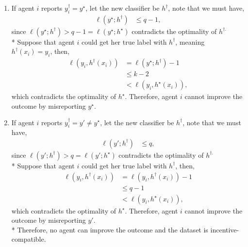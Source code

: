 \documentclass{article}
\begin{document}
\begin{enumerate}
\item If agent $i $ reports $y^{\dagger}_{i} = y^\star $, let the new classifier be $h^{\dagger}$, note that we must have,
\begin{align*}
\ell\left(y^\star  ; h^{\dagger}\right) &\leq  q - 1,
\end{align*}
since $\ell\left(y^\star  ; h^{\dagger}\right) > q - 1 = \ell\left(y^\star  ; h^\star \right)$ contradicts the optimality of $h^{\dagger.}$
\\* Suppose that agent $i $ could get her true label with $h^{\dagger}$, meaning $h^{\dagger}\left(x_{i}\right) = y_{i}$, then,
\begin{align*}
\ell\left(y_{i},  h^{\dagger}\left(x_{i}\right)\right) &= \ell\left(y^\star  ; h^{\dagger}\right) - 1
\\ &\leq  k - 2
\\ &< \ell\left(y_{i}, h^\star \left(x_{i}\right)\right),
\end{align*}
which contradicts the optimality of $h^\star $. Therefore, agent $i $ cannot improve the outcome by misreporting $y^\star $.
\item If agent $i $ reports $y^{\dagger}_{i} = y' \neq  y^\star $, let the new classifier be $h^{\dagger}$, note that we must have,
\begin{align*}
\ell\left(y' ; h^{\dagger}\right) &\leq  q,
\end{align*}
since $\ell\left(y' ; h^{\dagger}\right) > q = \ell\left(y' ; h^\star \right)$ contradicts the optimality of $h^{\dagger.}$
\\* Suppose that agent $i $ could get her true label with $h^{\dagger}$, then,
\begin{align*}
\ell\left(y_{i},  h^{\dagger}\left(x_{i}\right)\right) &= \ell\left(y_{i},  h^{\dagger}\left(x_{i}\right)\right) - 1
\\ &\leq  q - 1
\\ &< \ell\left(y_{i}, h^\star \left(x_{i}\right)\right),
\end{align*}
which contradicts the optimality of $h^\star $. Therefore, agent $i $ cannot improve the outcome by misreporting $y'$.
\\* Therefore, no agent can improve the outcome and the dataset is incentive-compatible.
\newline \newline
\end{enumerate}
\end{document}
